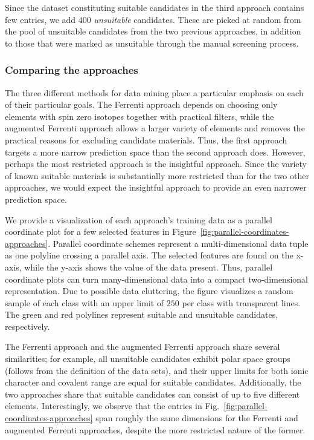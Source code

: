 \documentclass[superscriptaddress,unsortedaddress,
 amsmath,amssymb,
 aps,
]{revtex4-2}
\newcommand{\marianne}[1]{\textcolor{blue}{#1}}
\begin{document}
Since the dataset constituting suitable candidates in the third approach contains few entries, we add $400$ \emph{unsuitable} candidates. These are picked at random from the pool of unsuitable candidates from the two previous approaches, in addition to those that were marked as unsuitable through the manual screening process. 

\subsubsection*{Comparing the approaches}
The three different methods for data mining place a particular emphasis on each of their particular goals. The Ferrenti approach depends on choosing only elements with spin zero isotopes together with practical filters, while the augmented Ferrenti approach allows a larger variety of elements and removes the practical reasons for excluding candidate materials. Thus, the first approach targets a more narrow prediction space than the second approach does. However, perhaps the most restricted approach is the insightful approach. Since the variety of known suitable materials is substantially more restricted than for the two other approaches, we would expect the insightful approach to provide an even narrower prediction space. 


We provide a visualization of each approach's training data as a parallel coordinate plot for a few selected features in Figure~\ref{fig:parallel-coordinates-approaches}. Parallel coordinate schemes \cite{Inselberga1990, Inselberg1985} represent a multi-dimensional data tuple as one polyline crossing a parallel axis. The selected features are found on the x-axis, while the y-axis shows the value of the data present. Thus, parallel coordinate plots can turn many-dimensional data into a compact two-dimensional representation. Due to possible data cluttering, the figure visualizes a random sample of each class with an upper limit of $250$ per class with transparent lines. The green and red polylines represent suitable and unsuitable candidates, respectively. 

The Ferrenti approach and the augmented Ferrenti approach share several similarities; 
for example, all unsuitable candidates exhibit polar space groups (follows from the definition of the data sets), and their upper limits for both ionic character and covalent range are equal for suitable candidates.  
Additionally, the two approaches share that suitable candidates can consist of up to five different elements. 
Interestingly, we observe that
the entries in Fig.~\ref{fig:parallel-coordinates-approaches} span roughly the same dimensions for the Ferrenti and augmented Ferrenti approaches, despite the more restricted nature of the former. 
\end{document}
